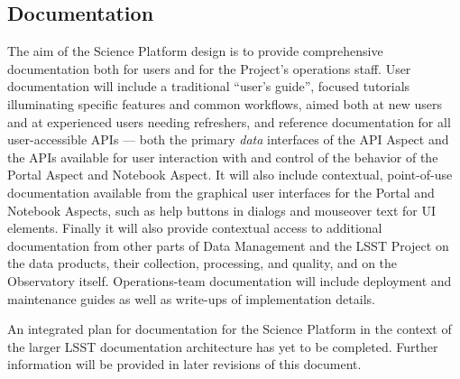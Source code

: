 \subsection{Documentation}\label{documentation-intro}

The aim of the Science Platform design is to provide comprehensive documentation both for users and for the Project's operations staff.
User documentation will include a traditional ``user's guide'',
focused tutorials illuminating specific features and common workflows,
aimed both at new users and at experienced users needing refreshers,
and reference documentation for all user-accessible APIs ---
both the primary \emph{data} interfaces of the API Aspect and the APIs available for user interaction with and control of the behavior of the Portal Aspect and Notebook Aspect.
It will also include contextual, point-of-use documentation available from the graphical user interfaces for the Portal and Notebook Aspects, such as help buttons in dialogs and mouseover text for UI elements.
Finally it will also provide contextual access to additional documentation from other parts of Data Management and the LSST Project on the data products, their collection, processing, and quality, and on the Observatory itself.
Operations-team documentation will include deployment and maintenance guides as well as write-ups of implementation details.

An integrated plan for documentation for the Science Platform in the context of the larger LSST documentation architecture has yet to be completed.
Further information will be provided in later revisions of this document.
